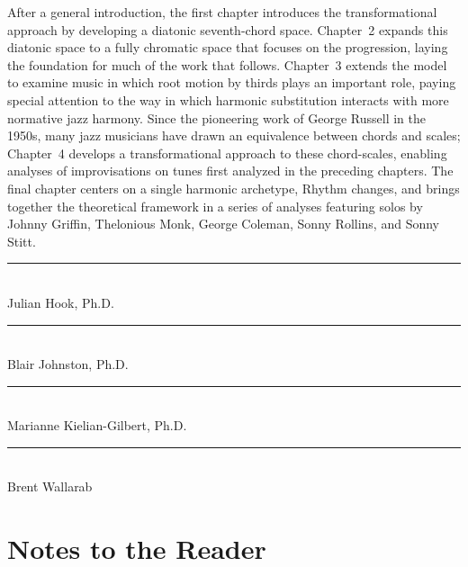 After a general introduction, the first chapter introduces the
transformational approach by developing a diatonic seventh-chord space.
Chapter~2 expands this diatonic space to a fully chromatic space that focuses
on the \tfo progression, laying the foundation for much of the work that
follows. Chapter~3 extends the model to examine music in which root motion by
thirds plays an important role, paying special attention to the way in which
harmonic substitution interacts with more normative jazz harmony. Since the
pioneering work of George Russell in the 1950s, many jazz musicians have drawn
an equivalence between chords and scales; Chapter~4 develops a
transformational approach to these chord-scales, enabling analyses of
improvisations on tunes first analyzed in the preceding chapters. The final
chapter centers on a single harmonic archetype, Rhythm changes, and brings
together the theoretical framework in a series of analyses featuring solos by
Johnny Griffin, Thelonious Monk, George Coleman, Sonny Rollins, and Sonny
Stitt.

{\flushright \singlespacing

\vspace*{3em}
\rule{20em}{0.5pt} \\ Julian Hook, Ph.D.

\vspace{3em}
\rule{20em}{0.5pt} \\ Blair Johnston, Ph.D.

\vspace{3em}
\rule{20em}{0.5pt} \\ Marianne Kielian-Gilbert, Ph.D.

\vspace{3em}
\rule{20em}{0.5pt} \\ Brent Wallarab

}

\clearpage
{}
{}
\singlespacing
\tableofcontents

\clearpage
{}
{}
\listoffigures


\clearpage

{}
\listoftables

\clearpage

\section*{\Large Notes to the Reader}
\label{sec:notes-to-reader}

